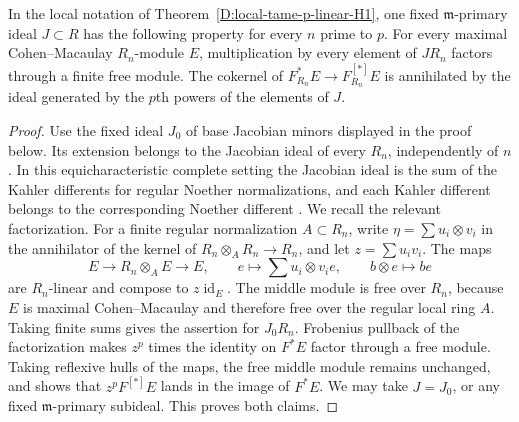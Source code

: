 \begin{lemma}
\label{D:Kummer-uniform-Frobenius-defect}
In the local notation of Theorem~\ref{D:local-tame-p-linear-H1}, one
fixed $\mathfrak m$-primary ideal $J\subset R$ has the following
property for every $n$ prime to $p$. For every maximal Cohen--Macaulay
$R_n$-module $E$, multiplication by every element of $JR_n$ factors
through a finite free module. The cokernel of
$F_{R_n}^*E\to F_{R_n}^{[*]}E$ is annihilated by the ideal generated
by the $p$th powers of the elements of $J$.
\end{lemma}
\begin{proof}
Use the fixed ideal $J_0$ of base Jacobian minors displayed in the
proof below. Its extension belongs to the Jacobian ideal of every
$R_n$, independently of $n$. In this equicharacteristic complete
setting the Jacobian ideal is the sum of the Kahler differents for
regular Noether normalizations, and each Kahler different belongs to
the corresponding Noether different
\citep[Section 2, pp.~2--3, and Section 3(3.1), Examples 3.2--3.3,
pp.~6--7]{C_IyengarTakahashiStable}.
We recall the relevant factorization. For a finite regular
normalization $A\subset R_n$, write
$\eta=\sum u_i\otimes v_i$ in the annihilator of the kernel of
$R_n\otimes_A R_n\to R_n$, and let $z=\sum u_iv_i$.
The maps
\[
 E\longrightarrow R_n\otimes_A E\longrightarrow E,
 \qquad e\longmapsto\sum u_i\otimes v_ie,
 \qquad b\otimes e\longmapsto be
\]
are $R_n$-linear and compose to $z\operatorname{id}_E$.
The middle module is free over $R_n$, because $E$ is maximal
Cohen--Macaulay and therefore free over the regular local ring $A$.
Taking finite sums gives the assertion for $J_0R_n$.
Frobenius pullback of the factorization makes $z^p$ times the identity
on $F^*E$ factor through a free module. Taking reflexive hulls of the
maps, the free middle module remains unchanged, and shows that
$z^pF^{[*]}E$ lands in the image of $F^*E$. We may take $J=J_0$,
or any fixed $\mathfrak m$-primary subideal. This proves both claims.
\end{proof}

